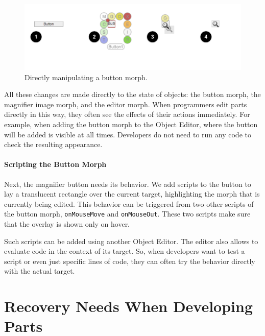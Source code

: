 \begin{figure}[h]
    \centering
    \includegraphics[width=\textwidth]{figures/3_motivation/3_buildingTheButton.png}
    \caption{Directly manipulating a button morph.}
    \label{fig:ButtonBuilding}
\end{figure}

All these changes are made directly to the state of objects: the button morph, the magnifier image morph, and the editor morph.
When programmers edit parts directly in this way, they often see the effects of their actions immediately.
For example, when adding the button morph to the Object Editor, where the button will be added is visible at all times.
Developers do not need to run any code to check the resulting appearance.

\paragraph{Scripting the Button Morph}
Next, the magnifier button needs its behavior.
We add scripts to the button to lay a translucent rectangle over the current target, highlighting the morph that is currently being edited.
This behavior can be triggered from two other scripts of the button morph, \lstinline{onMouseMove} and \lstinline{onMouseOut}.
These two scripts make sure that the overlay is shown only on hover.

Such scripts can be added using another Object Editor.
The editor also allows to evaluate code in the context of its target.
So, when developers want to test a script or even just specific lines of code, they can often try the behavior directly with the actual target.


\section{Recovery Needs When Developing Parts}


